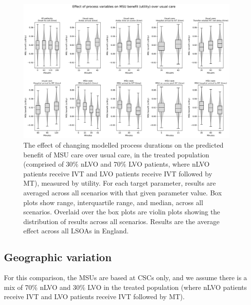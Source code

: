 \begin{figure}[h!]
    \centering
    \includegraphics[width=1\linewidth]{images/msu_net_utility_benefit.png}
    \caption{The effect of changing modelled process durations on the predicted benefit of MSU care over usual care, in the treated population (comprised of 30\% nLVO and 70\% LVO patients, where nLVO patients receive IVT and LVO patients receive IVT followed by MT), measured by utility. For each target parameter, results are averaged across all scenarios with that given parameter value. Box plots show range, interquartile range, and median, across all scenarios. Overlaid over the box plots are violin plots showing the distribution of results across all scenarios. Results are the average effect across all LSOAs in England.}
    \label{fig:scenarios_utility}
\end{figure}

\subsection{Geographic variation}

For this comparison, the MSUs are based at CSCs only, and we assume there is a mix of 70\% nLVO and 30\% LVO in the treated population (where nLVO patients receive IVT and LVO patients receive IVT followed by MT).

